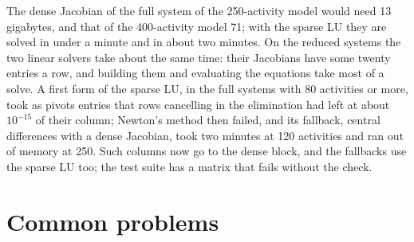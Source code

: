 The dense Jacobian of the full system of the 250-activity model would need 13
gigabytes, and that of the 400-activity model 71; with the sparse LU they are
solved in under a minute and in about two minutes. On the reduced systems the
two linear solvers take about the same time: their Jacobians have some twenty
entries a row, and building them and evaluating the equations take most of a
solve. A first form of the sparse LU, in the full systems with 80 activities
or more, took as pivots entries that rows cancelling in the elimination had
left at about $10^{-15}$ of their column; Newton's method then failed, and its
fallback, central differences with a dense Jacobian, took two minutes at 120
activities and ran out of memory at 250. Such columns now go to the dense
block, and the fallbacks use the sparse LU too; the test suite has a matrix
that fails without the check.

\section{Common problems}

